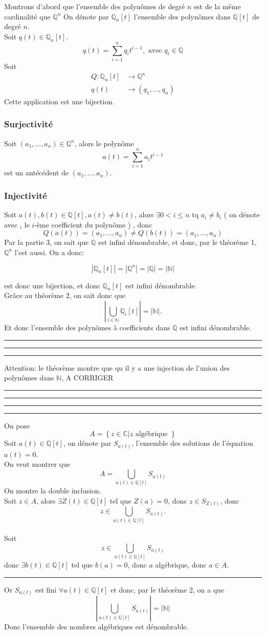 \documentclass[11pt, a4paper, twoside]{article}
\newcommand\hr{
    \noindent\rule[0.5ex]{\linewidth}{0.5pt}\newline
}
\begin{document}
Montrons d'abord que l'ensemble des polynômes de degré $n$ est de la même cardinalité que $\mathbb{Q}^{n}$
On dénote par $\mathbb{Q}_n[t]$ l'ensemble des polynômes dans $\mathbb{Q}[t]$ de degré $n$.\\
Soit $q(t) \in \mathbb{Q}_n[t]$.
\[ 
	q(t) = \sum_{i=1}^{n} q_i t^{i-1}, \text{ avec } q_i \in \mathbb{Q}
\]
Soit 
 \begin{align*}
	 Q: \mathbb{Q}_n[t] &\to \mathbb{Q}^{n}\\
	 q(t) &\to (q_1, \ldots, q_n)
\end{align*}
Cette application est une bijection.
\subsubsection*{Surjectivité}
Soit $(a_1,\ldots, a_n) \in \mathbb{Q}^{n}$, alors le polynôme
\[ 
	a(t) = \sum_{i=1}^{n} a_i t^{i-1}
\]
est un antécédent de $ ( a_1, \ldots, a_n)$.
\subsubsection*{Injectivité}
Soit $a(t), b(t) \in \mathbb{Q}[t], a(t) \neq b(t)$, alors $\exists 0<i \leq n$ tq $a_i \neq b_i$ ( on dénote avec $_i$ le $i$-ème coefficient du polynôme ) , donc
\[ 
	Q(a(t)) = ( a_1, \ldots, a_n) \neq Q(b(t)) = ( a_1, \ldots, a_n)
\]
Par la partie 3, on sait que $\mathbb{Q}$ est infini dénombrable, et donc, par le théorème 1, $\mathbb{Q}^{n}$ l'est aussi. On a donc:

\[ 
	|\mathbb{Q}_n[t]| = | \mathbb{Q}^{n}| = |\mathbb{Q}| = |\mathbb{N}|
\]


est donc une bijection, et donc $\mathbb{Q}_n[t]$ est infini dénombrable.\\
Grâce au théorème 2, on sait donc que
\[ 
	|\bigcup_{i \in \mathbb{N}} \mathbb{Q}_i[t]| = |\mathbb{N}|.
\]
Et donc l'ensemble des polynômes à coefficients dans $\mathbb{Q}$ est infini dénombrable.\\
\hr\hr\hr
Attention: le théorème montre que qu il y a une injection de l'union des polynômes dans $\mathbb{N}$, A CORRIGER\\
\hr\hr\hr

\hr
On pose
\[ 
A = \left\{ z \in \mathbb{C} | z \text{ algébrique }  \right\}
\]
Soit $a(t) \in \mathbb{Q}[t]$, on dénote par $S_{a(t)}$, l'ensemble des solutions de l'équation $a(t)=0$.\\
On veut montrer que 
\[ 
	A = \bigcup_{a(t) \in \mathbb{Q}[t]} S_{a(t)} 
\]
On montre la double inclusion.\\
Soit $z \in A$, alors $\exists Z(t) \in \mathbb{Q}[t]$ tel que $Z(a)=0$, donc $z \in S_{Z(t)} $, donc 
$$z \in \bigcup_{a(t) \in \mathbb{Q}[t]} S_{a(t)}. $$\\
Soit
$$z \in \bigcup_{a(t) \in \mathbb{Q}[t]} S_{a(t)}  $$
donc $\exists b(t) \in \mathbb{Q}[t]$ tel que $b(a)=0$, donc $a$ algébrique, donc $a \in A$.\\
\hr
Or $ S_{a(t)} $ est fini $\forall a(t) \in \mathbb{Q}[t]$ et donc, par le théorème 2, on a que
\[ 
	|\bigcup_{a(t) \in \mathbb{Q}[t]} S_{a(t)} | = |\mathbb{N}|
\]
Donc l'ensemble des nombres algébriques est dénombrable.
\end{document}
